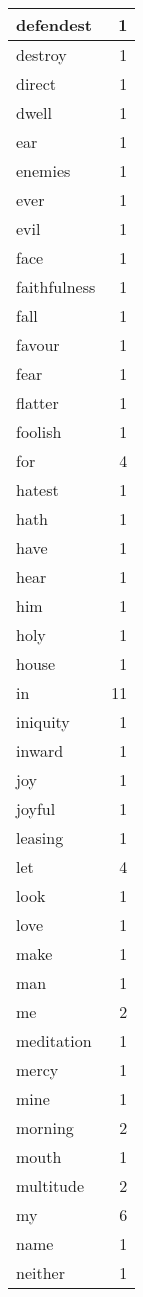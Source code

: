 \begin{center}
\begin{longtable}{l|r}
defendest & 1 \\ \hline
destroy & 1 \\ \hline
direct & 1 \\ \hline
dwell & 1 \\ \hline
ear & 1 \\ \hline
enemies & 1 \\ \hline
ever & 1 \\ \hline
evil & 1 \\ \hline
face & 1 \\ \hline
faithfulness & 1 \\ \hline
fall & 1 \\ \hline
favour & 1 \\ \hline
fear & 1 \\ \hline
flatter & 1 \\ \hline
foolish & 1 \\ \hline
for & 4 \\ \hline
hatest & 1 \\ \hline
hath & 1 \\ \hline
have & 1 \\ \hline
hear & 1 \\ \hline
him & 1 \\ \hline
holy & 1 \\ \hline
house & 1 \\ \hline
in & 11 \\ \hline
iniquity & 1 \\ \hline
inward & 1 \\ \hline
joy & 1 \\ \hline
joyful & 1 \\ \hline
leasing & 1 \\ \hline
let & 4 \\ \hline
look & 1 \\ \hline
love & 1 \\ \hline
make & 1 \\ \hline
man & 1 \\ \hline
me & 2 \\ \hline
meditation & 1 \\ \hline
mercy & 1 \\ \hline
mine & 1 \\ \hline
morning & 2 \\ \hline
mouth & 1 \\ \hline
multitude & 2 \\ \hline
my & 6 \\ \hline
name & 1 \\ \hline
neither & 1 \\ \hline

\end{longtable}
\end{center}
